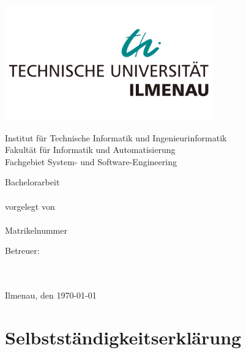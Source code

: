 \begin{titlepage}

\begin{center}
\includegraphics[height=5cm]{bilder/logo.png}

Institut für Technische Informatik und Ingenieurinformatik \\
Fakultät für Informatik und Automatisierung\\
Fachgebiet System- und Software-Engineering

\vspace{3cm}

{\Large Bachelorarbeit} \\ 
\vspace{1cm}
{\huge \normalfont \bfseries \sathema} \\
\vspace{1cm}
{vorgelegt von} \\
\vspace{0.5cm}
{\large \saauthor}\\
{\large Matrikelnummer \matrikel}
\vspace{2cm}

Betreuer: \\
\vspace{0.5cm}
\saprof \\
\sabetreuer \\

\vspace{1cm}

Ilmenau, den \today
\end{center}

\end{titlepage}

\newpage

\chapter*{Selbstständigkeitserklärung}
\thispagestyle{empty}	%

